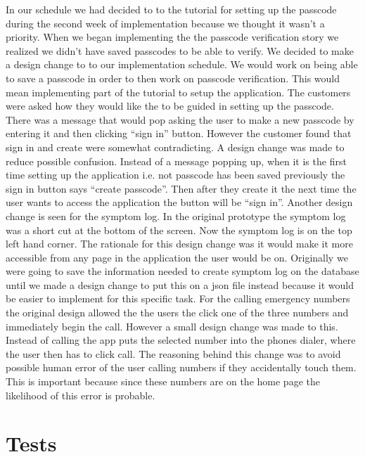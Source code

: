 \documentclass[letterpaper,12pt,titlepage]{article}
\begin{document}
In our schedule we had decided to to the tutorial for setting up the passcode during the second week of implementation because we thought it wasn't a priority. When we began implementing the the passcode verification story we realized we didn’t have saved passcodes to be able to verify. We decided to make a design change to to our implementation schedule. We would work on being able to save a passcode in order to then work on passcode verification. This would mean implementing part of the tutorial to setup the application. The customers were asked how they would like the to be guided in setting up the passcode. There was a message that would pop asking the user to make a new passcode by entering it and then clicking “sign in” button. However the customer found that sign in and create were somewhat contradicting. A design change was made to reduce possible confusion. Instead of a message popping up, when it is the first time setting up the application i.e. not passcode has been saved previously the sign in button says “create passcode”. Then after they create it the next time the user wants to access the application the button will be “sign in”.  
\newline
\newline
Another design change is seen for the symptom log. In the original prototype the symptom log was a short cut at the bottom of the screen. Now the symptom log is on the top left hand corner. The rationale for this design change was it would make it more accessible from any page in the application the user would be on. Originally we were going to save the information needed to create  symptom log on the database until we made a design change to put this on a json file instead because it would be easier to implement for this specific task.
\newline
\newline
For the calling emergency numbers the original design allowed the the users the click one of the three numbers and immediately begin the call. However a small design change was made to this. Instead of calling the app puts the selected number into the phones dialer, where the user then has to click call. The reasoning behind this change was to avoid possible human error of the user calling numbers if they accidentally touch them. This is important because since these numbers are on the home page the likelihood of this error is probable.

\newpage
\section{Tests}
\end{document}
